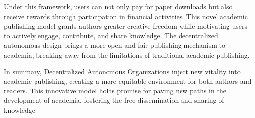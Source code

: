\documentclass[lettersize,journal]{IEEEtran}
\begin{document}
Under this framework, users can not only pay for paper downloads but also receive rewards through participation in financial activities. This novel academic publishing model grants authors greater creative freedom while motivating users to actively engage, contribute, and share knowledge. The decentralized autonomous design brings a more open and fair publishing mechanism to academia, breaking away from the limitations of traditional academic publishing.

In summary, Decentralized Autonomous Organizations inject new vitality into academic publishing, creating a more equitable environment for both authors and readers. This innovative model holds promise for paving new paths in the development of academia, fostering the free dissemination and sharing of knowledge.







\end{document}

